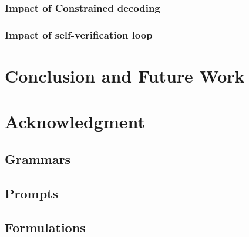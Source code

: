 \documentclass[conference]{IEEEtran}
\begin{document}
\subsubsection{Impact of Constrained decoding}


\subsubsection{Impact of self-verification loop}

\section{Conclusion and Future Work}

\section*{Acknowledgment}




\appendix
\subsection{Grammars}
\subsection{Prompts}
\subsection{Formulations}
\end{document}
